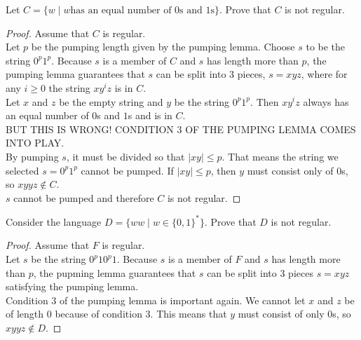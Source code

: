 \documentclass[11pt,a4paper]{article}
\begin{document}
\begin{example}
    Let $C=\{w\mid w\text{has an equal number of $0$s and $1$s}\}$. Prove that $C$ is not regular.

    \begin{proof}
        Assume that $C$ is regular. \\

        Let $p$ be the pumping length given by the pumping lemma. Choose $s$ to be the string $0^p1^p$.
        Because $s$ is a member of $C$ and $s$ has length more than $p$, the pumping lemma guarantees that $s$ can be split into 3 pieces, $s=xyz$, where for any $i\geq 0$ the string $xy^iz$ is in $C$. \\
        
        Let $x$ and $z$ be the empty string and $y$ be the string $0^p1^p$. Then $xy^iz$ always has an equal number of $0$s and $1$s and is in $C$. \\

        BUT THIS IS WRONG! CONDITION 3 OF THE PUMPING LEMMA COMES INTO PLAY. \\
        
        By pumping $s$, it must be divided so that $|xy|\leq p$. That means the string we selected $s=0^p1^p$ cannot be pumped.
        If $|xy|\leq p$, then $y$ must consist only of $0$s, so $xyyz\notin C$. \\

        $s$ cannot be pumped and therefore $C$ is not regular.
    \end{proof}
\end{example}

\begin{example}
    Consider the language $D=\{ww\mid w\in\{0,1\}^*\}$. Prove that $D$ is not regular.
    
    \begin{proof}
        Assume that $F$ is regular. \\

        Let $s$ be the string $0^p10^p1$. Because $s$ is a member of $F$ and $s$ has length more than $p$, the pupming lemma guarantees that $s$ can be split into 3 pieces $s=xyz$ satisfying the pumping lemma. \\

        Condition 3 of the pumping lemma is important again. We cannot let $x$ and $z$ be of length 0 because of condition 3.
        This means that $y$ must consist of only $0$s, so $xyyz\notin D$.
    \end{proof}
\end{example}
\end{document}
